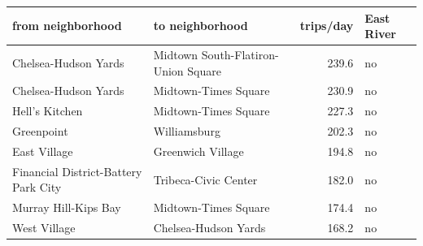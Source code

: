 \begin{tabular}{llrl}
\toprule
\textbf{from neighborhood} & \textbf{to neighborhood} & \textbf{trips/day} & \textbf{East River} \\
\midrule
Chelsea-Hudson Yards & Midtown South-Flatiron-Union Square & 239.6 & no \\
Chelsea-Hudson Yards & Midtown-Times Square & 230.9 & no \\
Hell's Kitchen & Midtown-Times Square & 227.3 & no \\
Greenpoint & Williamsburg & 202.3 & no \\
East Village & Greenwich Village & 194.8 & no \\
Financial District-Battery Park City & Tribeca-Civic Center & 182.0 & no \\
Murray Hill-Kips Bay & Midtown-Times Square & 174.4 & no \\
West Village & Chelsea-Hudson Yards & 168.2 & no \\
\bottomrule
\end{tabular}
